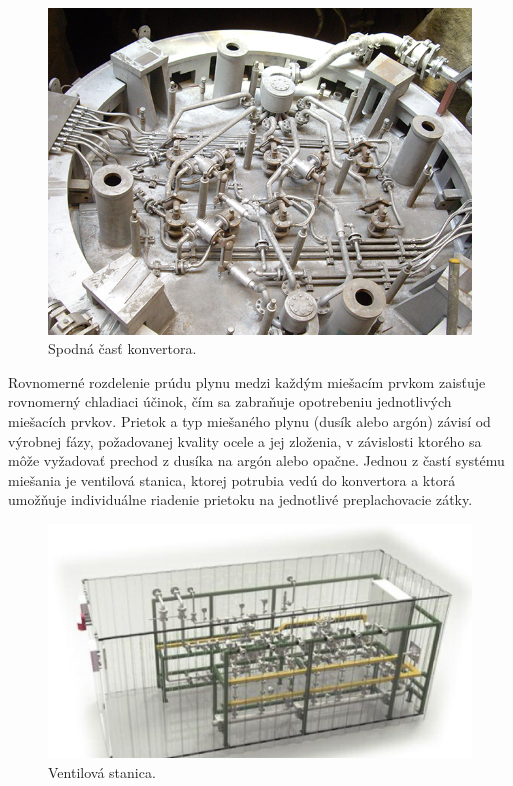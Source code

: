 \documentclass[]{tukediphc}
\begin{document}
\begin{figure}[h!]
	\centering
	\includegraphics[width=.7\textwidth,angle=0]{figures/bottom-stirring-tuyeres.jpg}
	\caption{Spodná časť konvertora.}
\end{figure}

\newpage

Rovnomerné rozdelenie prúdu plynu medzi každým miešacím prvkom zaisťuje rovnomerný chladiaci účinok, čím sa zabraňuje opotrebeniu jednotlivých miešacích prvkov. Prietok a typ miešaného plynu (dusík alebo argón) závisí od výrobnej fázy, požadovanej kvality ocele a jej zloženia, v závislosti ktorého sa môže vyžadovať prechod z dusíka na argón alebo opačne. Jednou z častí systému miešania je ventilová stanica, ktorej potrubia vedú do konvertora a ktorá umožňuje individuálne riadenie prietoku na jednotlivé preplachovacie zátky.

\begin{figure}[h!]
	\centering
	\includegraphics[width=.6\textwidth,angle=0]{figures/valve-station.jpg}
	\caption{Ventilová stanica.}
\end{figure}

%

%
\end{document}

